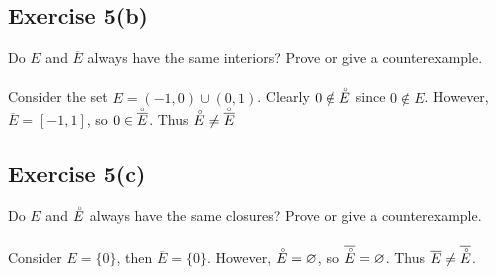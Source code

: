 \documentclass[12pt]{article}
\newenvironment{problem}
    {\begin{lrbox}{\mybox}\begin{minipage}{\textwidth-10pt}}
    {\end{minipage}\end{lrbox}\framebox[6.5in]{\usebox{\mybox}}}
\newcommand{\clo}[1]{\overline{#1}}
\let\emptyset\varnothing
\begin{document}
\subsection*{Exercise 5(b)}
\begin{problem}
    Do $E$ and $\overline{E}$ always have the same interiors? Prove or give a counterexample.
\end{problem}
\paragraph{}

Consider the set $E = (-1,0)\cup(0,1)$. Clearly $0\notin\accentset{\circ}{E}$ since $0\notin E$. However, $\clo{E}=[-1,1]$, so $0\in\accentset{\circ}{\clo{E}}$. Thus $\accentset{\circ}{E}\ne\accentset{\circ}{\clo{E}}$


\subsection*{Exercise 5(c)}
\begin{problem}
    Do $E$ and $\accentset{\circ}{E}$ always have the same closures? Prove or give a counterexample.
\end{problem}
\paragraph{}

Consider $E=\{0\}$, then $\clo{E}=\{0\}$. However, $\accentset{\circ}{E}=\emptyset$, so $\clo{\accentset{\circ}{E}}=\emptyset$. Thus $\clo{E}\ne\clo{\accentset{\circ}{E}}$.
\end{document}
